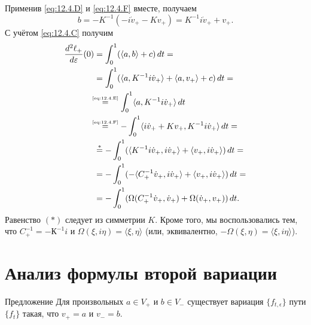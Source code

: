 Применив \ref{eq:12.4.D} и \ref{eq:12.4.F} вместе, получаем
\[b=-K^{-1}(-i\dot v_+ - K v_+) = K^{-1}i\dot v_+ + v_+.\]
С учётом \ref{eq:12.4.C} получим
\begin{align*}
\frac{d^2\ell_+}{d\varepsilon}(0)
&=
\int_0^1(\langle a, b\rangle+c)\,d t=
\\
&=\int_0^1(\langle a, K^{-1}i\dot v_+\rangle+\langle a, v_+\rangle+c)\,d t=
\\
&\!\!\!\stackrel{\text{\tiny \ref{eq:12.4.E}}}{=}
\int_0^1 \langle a,
K^{-1}i\dot v_+\rangle\,d t 
\\
&\!\!\!\stackrel{\text{\tiny \ref{eq:12.4.F}}}{=}
-\int_0^1\langle i\dot
v_++Kv_+, K^{-1}i\dot v_+\rangle\,d t= 
\\
&\stackrel{{*}}{=}
-\int_0^1
(\langle K^{-1}i\dot v_+, i\dot v_+\rangle +\langle v_+,
i\dot v_+\rangle)\,d t= 
\\
&=
-\int_0^1
(-\langle C_+^{-1}\dot v_+, i\dot v_+\rangle
+\langle v_+, i\dot v_+\rangle)\,d t=
\\
&=
-\int_0^1
(\Omega(C_+^{-1}\dot v_+,\dot v_+)+\Omega(\dot v_+,v_+))\,d t.
\end{align*}
Равенство $({*})$ следует из симметрии $K$.
Кроме того, мы воспользовались тем, что $C_+^{-1} = -К^{-1} i$ и
$\Omega(\xi, i\eta) = \langle \xi, \eta\rangle$ 
(или, эквивалентно, $-\Omega(\xi, \eta) = \langle \xi, i\eta\rangle$).
\qeds

\section{Анализ формулы второй вариации}\label{sec:12.5}

\begin{thm}{Предложение}\label{12.5.A}
Для произвольных $a \in V_+$ и $b \in V_-$ существует вариация
$\{f_{t,\epsilon}\}$ пути $\{f_t\}$ такая, что $v_+ = a$ и $v_- = b$. 
\end{thm}


